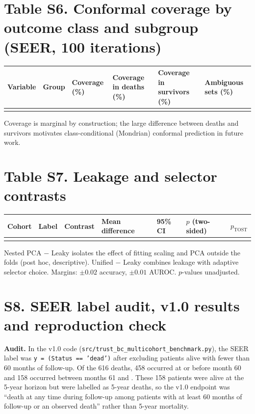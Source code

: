 \documentclass[10pt,a4paper]{article}
\begin{document}
\section*{Table S6. Conformal coverage by outcome class and subgroup (SEER, 100 iterations)}
{\small
\begin{tabularx}{\textwidth}{@{}llYYYY@{}}
\toprule
\textbf{Variable} & \textbf{Group} & \textbf{Coverage (\%)} & \textbf{Coverage in deaths (\%)} & \textbf{Coverage in survivors (\%)} & \textbf{Ambiguous sets (\%)}\\
\midrule
{}
\bottomrule
\end{tabularx}
}
Coverage is marginal by construction; the large difference between deaths and survivors motivates class-conditional (Mondrian) conformal prediction in future work.

\section*{Table S7. Leakage and selector contrasts}
{\small
\begin{tabularx}{\textwidth}{@{}lllYYll@{}}
\toprule
\textbf{Cohort} & \textbf{Label} & \textbf{Contrast} & \textbf{Mean difference} & \textbf{95\% CI} & \textbf{$p$ (two-sided)} & \textbf{$p_{\text{TOST}}$}\\
\midrule
{}
\bottomrule
\end{tabularx}
}
Nested PCA $-$ Leaky isolates the effect of fitting scaling and PCA outside the folds (post hoc, descriptive). Unified $-$ Leaky combines leakage with adaptive selector choice. Margins: $\pm0.02$ accuracy, $\pm0.01$ AUROC. $p$-values unadjusted.

\newpage
\section*{S8. SEER label audit, v1.0 results and reproduction check}
\textbf{Audit.} In the v1.0 code (\texttt{src/trust\_bc\_multicohort\_benchmark.py}), the SEER label was \texttt{y = (Status == 'dead')} after excluding patients alive with fewer than 60 months of follow-up. Of the 616 deaths, 458 occurred at or before month 60 and 158 occurred between months 61 and \seerMaxDeathMonth. These 158 patients were alive at the 5-year horizon but were labelled as 5-year deaths, so the v1.0 endpoint was ``death at any time during follow-up among patients with at least 60 months of follow-up or an observed death'' rather than 5-year mortality.
\end{document}
